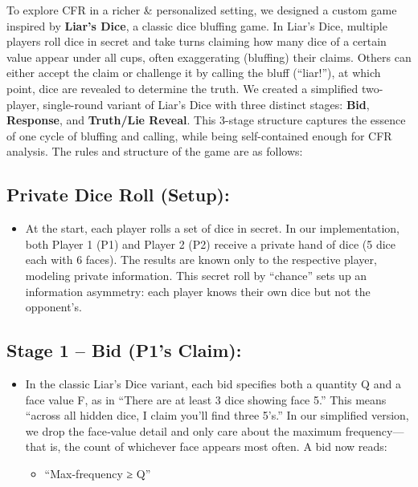 \documentclass[
]{article}
\begin{document}
To explore CFR in a richer \& personalized setting, we designed a custom
game inspired by \textbf{Liar's Dice}, a classic dice bluffing game. In
Liar's Dice, multiple players roll dice in secret and take turns
claiming how many dice of a certain value appear under all cups, often
exaggerating (bluffing) their claims. Others can either accept the claim
or challenge it by calling the bluff (``liar!''), at which point, dice
are revealed to determine the truth. We created a simplified two-player,
single-round variant of Liar's Dice with three distinct stages:
\textbf{Bid}, \textbf{Response}, and \textbf{Truth/Lie Reveal}. This
3-stage structure captures the essence of one cycle of bluffing and
calling, while being self-contained enough for CFR analysis. The rules
and structure of the game are as follows:

\subsection{\texorpdfstring{\textbf{Private Dice Roll (Setup):}
}{Private Dice Roll (Setup): }}\label{private-dice-roll-setup}

\begin{itemize}
\item
  At the start, each player rolls a set of dice in secret. In our
  implementation, both Player 1 (P1) and Player 2 (P2) receive a private
  hand of dice (5 dice each with 6 faces). The results are known only to
  the respective player, modeling private information. This secret roll
  by ``chance'' sets up an information asymmetry: each player knows
  their own dice but not the opponent's.
\end{itemize}

\subsection{\texorpdfstring{\textbf{Stage 1 -- Bid (P1's Claim):}
}{Stage 1 -- Bid (P1's Claim): }}\label{stage-1-bid-p1s-claim}

\begin{itemize}
\item
  In the classic Liar's Dice variant, each bid specifies both a quantity
  Q and a face value F, as in ``There are at least 3 dice showing face
  5.'' This means ``across all hidden dice, I claim you'll find three
  5's.'' In our simplified version, we drop the face‐value detail and
  only care about the maximum frequency---that is, the count of
  whichever face appears most often. A bid now reads:

  \begin{itemize}
  \item
    ``Max-frequency ≥ Q''
  \end{itemize}
\end{itemize}
\end{document}
